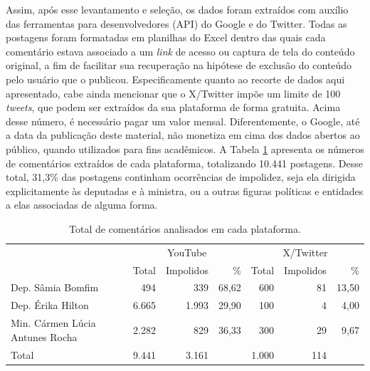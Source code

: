 \documentclass[portuguese]{textolivre}
\begin{document}
Assim, após esse levantamento e seleção, os dados foram extraídos com auxílio das ferramentas para desenvolvedores (API) do Google e do Twitter. Todas as postagens foram formatadas em planilhas do Excel dentro das quais cada comentário estava associado a um \textit{link} de acesso ou captura de tela do conteúdo original, a fim de facilitar sua recuperação na hipótese de exclusão do conteúdo pelo usuário que o publicou. Especificamente quanto ao recorte de dados aqui apresentado, cabe ainda mencionar que o X/Twitter impõe um limite de 100 \textit{tweets}, que podem ser extraídos da sua plataforma de forma gratuita. Acima desse número, é necessário pagar um valor mensal. Diferentemente, o Google, até a data da publicação deste material, não monetiza em cima dos dados abertos ao público, quando utilizados para fins acadêmicos. A Tabela \ref{tab-1} apresenta os números de comentários extraídos de cada plataforma, totalizando 10.441 postagens. Desse total, 31,3\% das postagens continham ocorrências de impolidez, seja ela dirigida explicitamente às deputadas e à ministra, ou a outras figuras políticas e entidades a elas associadas de alguma forma.

\begin{table}[h!]
\centering
\begin{threeparttable}
\caption{Total de comentários analisados em cada plataforma.}\label{tab-1}
\begin{tabular}{lrrrrrr}
\toprule
 & \multicolumn{3}{c}{YouTube} & \multicolumn{3}{c}{X/Twitter} \\
\cmidrule(lr){2-4} \cmidrule(lr){5-7}
 & Total & Impolidos & \% & Total & Impolidos & \% \\
\midrule
Dep. Sâmia Bomfim & 494 & 339 & 68{,}62 & 600 & 81 & 13{,}50 \\
Dep. Érika Hilton & 6.665 & 1.993 & 29{,}90 & 100 & 4 & 4{,}00 \\
Min. Cármen Lúcia Antunes Rocha & 2.282 & 829 & 36{,}33 & 300 & 29 & 9{,}67 \\
\midrule
Total & 9.441 & 3.161 &  & 1.000 & 114 &  \\
\bottomrule
\end{tabular}
\end{threeparttable}
\end{table}
\end{document}
